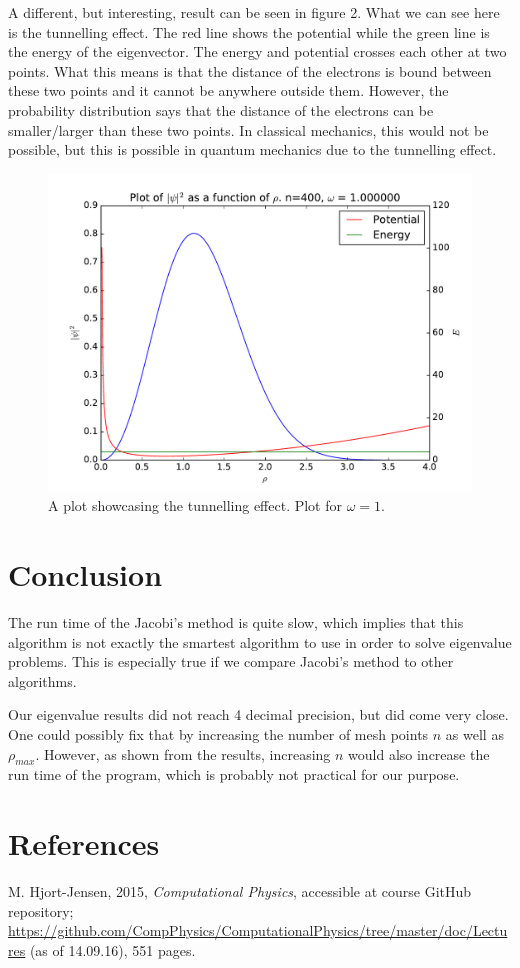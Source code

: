 \documentclass[12pt]{article}
\begin{document}
A different, but interesting, result can be seen in figure 2. What we can see here is the tunnelling effect. The red line shows the potential while the green line is the energy of the eigenvector. The energy and potential crosses each other at two points. What this means is that the distance of the electrons is bound between these two points and it cannot be anywhere outside them. However, the probability distribution says that the distance of the electrons can be smaller/larger than these two points. In classical mechanics, this would not be possible, but this is possible in quantum mechanics due to the tunnelling effect.

\begin{figure}[hbtp]
\centering
\includegraphics[width=\linewidth]{Plots/Plot_groundstate_tunneling_effect.pdf}
\caption{A plot showcasing the tunnelling effect. Plot for $\omega = 1$.}
\end{figure}


\section{Conclusion}
The run time of the Jacobi's method is quite slow, which implies that this algorithm is not exactly the smartest algorithm to use in order to solve eigenvalue problems. This is especially true if we compare Jacobi's method to other algorithms.

Our eigenvalue results did not reach 4 decimal precision, but did come very close. One could possibly fix that by increasing the number of mesh points $n$ as well as $\rho_{max}$. However, as shown from the results, increasing $n$ would also increase the run time of the program, which is probably not practical for our purpose.
\section{References}
M. Hjort-Jensen, 2015, \textit{Computational Physics}, accessible at course GitHub repository; \url{https://github.com/CompPhysics/ComputationalPhysics/tree/master/doc/Lectures} (as of 14.09.16), 551 pages.
\end{document}
